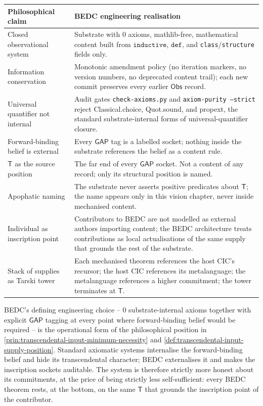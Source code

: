 \begin{longtable}{p{}p{}}
\toprule
\textbf{Philosophical claim} & \textbf{BEDC engineering realisation} \\
\midrule
Closed observational system & Substrate with 0 axioms, mathlib-free, mathematical content built from $\texttt{inductive}$, $\texttt{def}$, and \texttt{class}/\texttt{structure} fields only. \\
Information conservation & Monotonic amendment policy (no iteration markers, no version numbers, no deprecated content trail); each new commit preserves every earlier $\mathsf{Obs}$ record. \\
Universal quantifier not internal & Audit gates \texttt{check-axioms.py} and \texttt{axiom-purity --strict} reject Classical.choice, Quot.sound, and propext, the standard substrate-internal forms of universal-quantifier closure. \\
Forward-binding belief is external & Every $\mathsf{GAP}$ tag is a labelled socket; nothing inside the substrate references the belief as a content rule. \\
$\mathsf{T}$ as the source position & The far end of every $\mathsf{GAP}$ socket. Not a content of any record; only its structural position is named. \\
Apophatic naming & The substrate never asserts positive predicates about $\mathsf{T}$; the name appears only in this vision chapter, never inside mechanised content. \\
Individual as inscription point & Contributors to BEDC are not modelled as external authors importing content; the BEDC architecture treats contributions as local actualisations of the same supply that grounds the rest of the substrate. \\
Stack of supplies as Tarski tower & Each mechanised theorem references the host CIC's recursor; the host CIC references its metalanguage; the metalanguage references a higher commitment; the tower terminates at $\mathsf{T}$. \\
\bottomrule
\end{longtable}

\begin{principle}
\label{prin:transcendental-input-bedc-honesty}
BEDC's defining engineering choice -- 0 substrate-internal axioms together with explicit $\mathsf{GAP}$ tagging at every point where forward-binding belief would be required -- is the operational form of the philosophical position in \autoref{prin:transcendental-input-minimum-necessity} and \autoref{def:transcendental-input-supply-position}. Standard axiomatic systems internalise the forward-binding belief and hide its transcendental character; BEDC externalises it and makes the inscription sockets auditable. The system is therefore strictly more honest about its commitments, at the price of being strictly less self-sufficient: every BEDC theorem rests, at the bottom, on the same $\mathsf{T}$ that grounds the inscription point of the contributor.
\end{principle}

